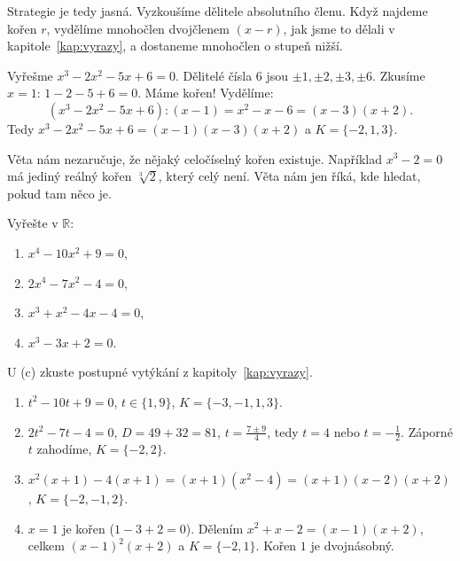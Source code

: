 Strategie je tedy jasná. Vyzkoušíme dělitele absolutního členu. Když najdeme kořen $r$, vydělíme mnohočlen dvojčlenem $(x - r)$, jak jsme to dělali v kapitole~\ref{kap:vyrazy}, a dostaneme mnohočlen o stupeň nižší.

\begin{example}
  Vyřešme $x^3 - 2x^2 - 5x + 6 = 0$. Dělitelé čísla $6$ jsou $\pm 1, \pm 2, \pm 3, \pm 6$. Zkusíme $x = 1$: $1 - 2 - 5 + 6 = 0$. Máme kořen! Vydělíme:
  \begin{equation*}
    (x^3 - 2x^2 - 5x + 6) : (x - 1) = x^2 - x - 6 = (x - 3)(x + 2).
  \end{equation*}
  Tedy $x^3 - 2x^2 - 5x + 6 = (x - 1)(x - 3)(x + 2)$ a $K = \{-2, 1, 3\}$.
\end{example}

\begin{note}
  Věta nám nezaručuje, že nějaký celočíselný kořen existuje. Například $x^3 - 2 = 0$ má jediný reálný kořen $\sqrt[3]{2}$, který celý není. Věta nám jen říká, kde hledat, pokud tam něco je.
\end{note}

\begin{problem}
  Vyřešte v $\mathbb{R}$:
  \begin{enumerate}[label=(\alph*)]
    \item $x^4 - 10x^2 + 9 = 0$,
    \item $2x^4 - 7x^2 - 4 = 0$,
    \item $x^3 + x^2 - 4x - 4 = 0$,
    \item $x^3 - 3x + 2 = 0$.
  \end{enumerate}
\end{problem}

\begin{hint}
  U (c) zkuste postupné vytýkání z kapitoly~\ref{kap:vyrazy}.
\end{hint}

\begin{solution}
  \begin{enumerate}[label=(\alph*)]
    \item $t^2 - 10t + 9 = 0$, $t\in\{1, 9\}$, $K = \{-3, -1, 1, 3\}$.
    \item $2t^2 - 7t - 4 = 0$, $D = 49 + 32 = 81$, $t = \frac{7\pm 9}{4}$, tedy $t = 4$ nebo $t = -\frac{1}{2}$. Záporné $t$ zahodíme, $K = \{-2, 2\}$.
    \item $x^2(x + 1) - 4(x + 1) = (x + 1)(x^2 - 4) = (x + 1)(x - 2)(x + 2)$, $K = \{-2, -1, 2\}$.
    \item $x = 1$ je kořen ($1 - 3 + 2 = 0$). Dělením $x^2 + x - 2 = (x - 1)(x + 2)$, celkem $(x - 1)^2(x + 2)$ a $K = \{-2, 1\}$. Kořen $1$ je dvojnásobný.
  \end{enumerate}
\end{solution}

